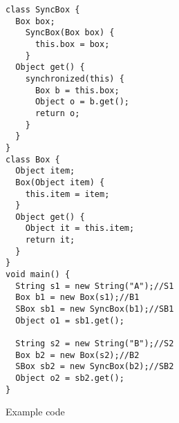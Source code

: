 
\begin{figure*}
\begin{center}
\begin{subfigure}[t]{\columnwidth}
\centering
\begin{lstlisting}[multicols=2, xleftmargin=20pt]
class SyncBox {
  Box box;
    SyncBox(Box box) {
      this.box = box;
    }
  Object get() {
    synchronized(this) {
      Box b = this.box;
      Object o = b.get();
      return o;
    }
  }
}
class Box {
  Object item;
  Box(Object item) {
    this.item = item;
  }
  Object get() {
    Object it = this.item;
    return it;
  }
}
void main() {
  String s1 = new String("A");//S1
  Box b1 = new Box(s1);//B1
  SBox sb1 = new SyncBox(b1);//SB1
  Object o1 = sb1.get();

  String s2 = new String("B");//S2
  Box b2 = new Box(s2);//B2
  SBox sb2 = new SyncBox(b2);//SB2
  Object o2 = sb2.get();
}
\end{lstlisting}
\caption{Example code}
\label{fig:unwrappedflow:code}
\end{subfigure}
\begin{multicols}{2}
	\begin{subfigure}[b]{\columnwidth}
		\begin{center}
\end{center}
\end{subfigure}
\end{multicols}
\end{center}
\end{figure*}
